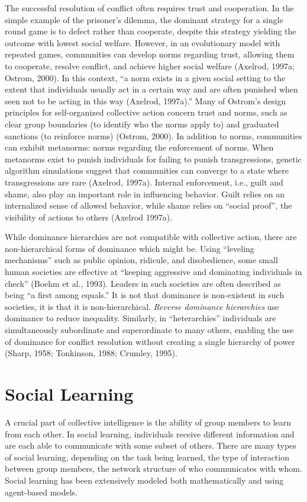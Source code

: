 The successful resolution of conflict often requires trust and cooperation. In the simple example of the prisoner's dilemma, the dominant strategy for a single round game is to defect rather than cooperate, despite this strategy yielding the outcome with lowest social welfare. However, in an evolutionary model with repeated games, communities can develop norms regarding trust, allowing them to cooperate, resolve conflict, and achieve higher social welfare (Axelrod, 1997a; Ostrom, 2000). In this context, ``a norm exists in a given social setting to the extent that individuals usually act in a certain way and are often punished when seen not to be acting in this way (Axelrod, 1997a).'' Many of Ostrom's design principles for self-organized collective action concern trust and norms, such as clear group boundaries (to identify who the norms apply to) and graduated sanctions (to reinforce norms) (Ostrom, 2000). In addition to norms, communities can exhibit metanorms: norms regarding the enforcement of norms. When metanorms exist to punish individuals for failing to punish transgressions, genetic algorithm simulations suggest that communities can converge to a state where transgressions are rare (Axelrod, 1997a). Internal enforcement, i.e., guilt and shame, also play an important role in influencing behavior. Guilt relies on an internalized sense of allowed behavior, while shame relies on ``social proof'', the visibility of actions to others (Axelrod 1997a).

While dominance hierarchies are not compatible with collective action, there are non-hierarchical forms of dominance which might be. Using ``leveling mechanisms'' such as public opinion, ridicule, and disobedience, some small human societies are effective at ``keeping aggressive and dominating individuals in check'' (Boehm et al., 1993). Leaders in such societies are often described as being ``a first among equals.'' It is not that dominance is non-existent in such societies, it is that it is non-hierarchical. {\em Reverse dominance hierarchies} use dominance to reduce inequality. Similarly, in ``heterarchies'' individuals are simultaneously subordinate and superordinate to many others, enabling the use of dominance for conflict resolution without creating a single hierarchy of power (Sharp, 1958; Tonkinson, 1988; Crumley, 1995).

\section{Social Learning}\label{sec:social-learning}
A crucial part of collective intelligence is the ability of group members to learn from each other. In social learning, individuals receive different information and are each able to communicate with some subset of others. There are many types of social learning, depending on the task being learned, the type of interaction between group members, the network structure of who communicates with whom. Social learning has been extensively modeled both mathematically and using agent-based models.

